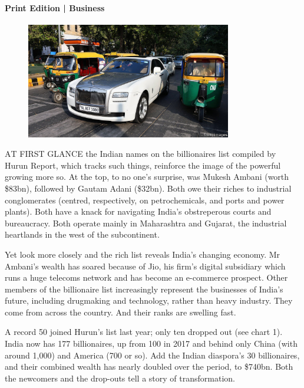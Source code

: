 \documentclass{article}
\begin{document}
\paragraph{Print Edition | Business  \quad \color{gray}{Mar 27th 2021 }}
\begin{figure}[h]
\centering
\includegraphics[width=0.8\textwidth]{images/20210327_wbp501.jpg}
\end{figure}
\lettrine{A}T FIRST GLANCE the Indian names on the billionaires list compiled by Hurun Report, which tracks such things, reinforce the image of the powerful growing more so. At the top, to no one's surprise, was Mukesh Ambani (worth \$83bn), followed by Gautam Adani (\$32bn). Both owe their riches to industrial conglomerates (centred, respectively, on petrochemicals, and ports and power plants). Both have a knack for navigating India's obstreperous courts and bureaucracy. Both operate mainly in Maharashtra and Gujarat, the industrial heartlands in the west of the subcontinent. 

Yet look more closely and the rich list reveals India's changing economy. Mr Ambani's wealth has soared because of Jio, his firm's digital subsidiary which runs a huge telecoms network and has become an e-commerce prospect. Other members of the billionaire list increasingly represent the businesses of India's future, including drugmaking and technology, rather than heavy industry. They come from across the country. And their ranks are swelling fast. 

A record 50 joined Hurun's list last year; only ten dropped out (see chart 1). India now has 177 billionaires, up from 100 in 2017 and behind only China (with around 1,000) and America (700 or so). Add the Indian diaspora's 30 billionaires, and their combined wealth has nearly doubled over the period, to \$740bn. Both the newcomers and the drop-outs tell a story of transformation. 
\end{document}
